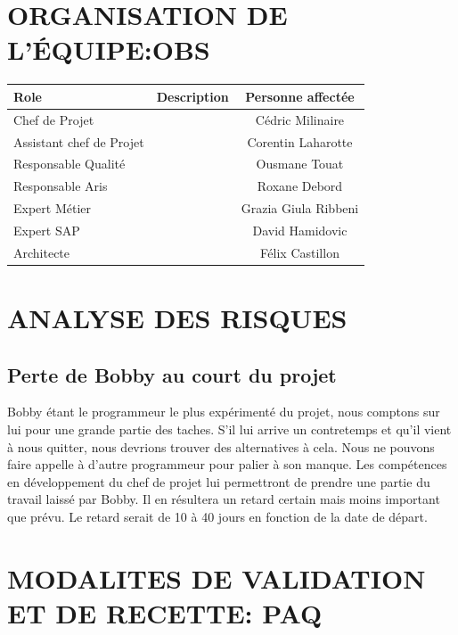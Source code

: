 \documentclass[]{scrartcl}
\begin{document}
\section{ORGANISATION DE L'ÉQUIPE:OBS}
\begin{center}
	\begin{tabular}{| l | c | c |}
	\hline
	Role                     & Description & Personne affectée  \\ 	\hline
	Chef de Projet           &             & Cédric Milinaire                   	\\ \hline
	Assistant chef de Projet &             & Corentin Laharotte                  	\\ \hline
	Responsable Qualité      &             & Ousmane Touat                 	\\ \hline
	Responsable Aris         &             & Roxane Debord                 	\\ \hline
	Expert Métier            &             & Grazia Giula Ribbeni                 	\\ \hline
	Expert SAP               &             & David Hamidovic                 	\\ \hline
	Architecte               &             & Félix Castillon  \\ 		\hline
	\end{tabular}
\end{center}

\section{ANALYSE DES RISQUES}
\subsection{Perte de Bobby au court du projet}
Bobby étant le programmeur le plus expérimenté du projet, nous comptons sur lui pour une grande partie des taches. S’il lui arrive un contretemps et qu’il vient à nous quitter, nous devrions trouver des alternatives à cela. Nous ne pouvons faire appelle à d’autre programmeur pour palier à son manque. Les compétences en développement du chef de projet lui permettront de prendre une partie du travail laissé par Bobby. Il en résultera un retard certain mais moins important que prévu. Le retard serait de 10 à 40 jours en fonction de la date de départ.
\section{MODALITES DE VALIDATION ET DE RECETTE: PAQ}
\end{document}
